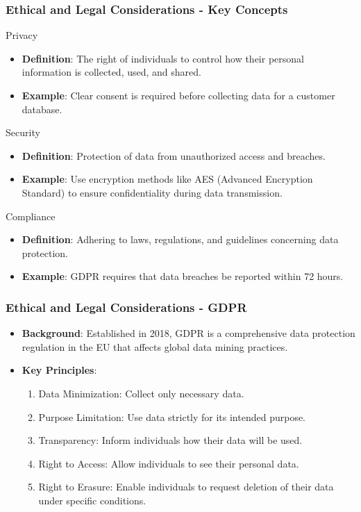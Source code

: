 \documentclass{beamer}
\begin{document}
\begin{frame}[fragile]
    \frametitle{Ethical and Legal Considerations - Key Concepts}
    \begin{block}{Privacy}
        \begin{itemize}
            \item \textbf{Definition}: The right of individuals to control how their personal information is collected, used, and shared.
            \item \textbf{Example}: Clear consent is required before collecting data for a customer database.
        \end{itemize}
    \end{block}
    
    \begin{block}{Security}
        \begin{itemize}
            \item \textbf{Definition}: Protection of data from unauthorized access and breaches.
            \item \textbf{Example}: Use encryption methods like AES (Advanced Encryption Standard) to ensure confidentiality during data transmission.
        \end{itemize}
    \end{block}
    
    \begin{block}{Compliance}
        \begin{itemize}
            \item \textbf{Definition}: Adhering to laws, regulations, and guidelines concerning data protection.
            \item \textbf{Example}: GDPR requires that data breaches be reported within 72 hours.
        \end{itemize}
    \end{block}
\end{frame}

\begin{frame}[fragile]
    \frametitle{Ethical and Legal Considerations - GDPR}
    \begin{itemize}
        \item \textbf{Background}: Established in 2018, GDPR is a comprehensive data protection regulation in the EU that affects global data mining practices.
        \item \textbf{Key Principles}:
        \begin{enumerate}
            \item Data Minimization: Collect only necessary data.
            \item Purpose Limitation: Use data strictly for its intended purpose.
            \item Transparency: Inform individuals how their data will be used.
            \item Right to Access: Allow individuals to see their personal data.
            \item Right to Erasure: Enable individuals to request deletion of their data under specific conditions.
        \end{enumerate}
    \end{itemize}
\end{frame}
\end{document}
